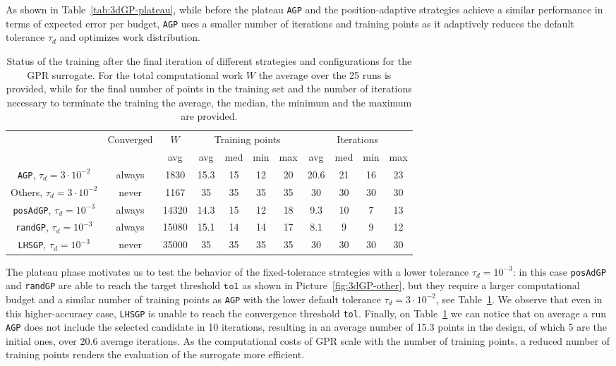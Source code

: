 As shown in Table~\ref{tab:3dGP-plateau}, while before the plateau \texttt{AGP} and the position-adaptive strategies achieve a similar performance in terms of expected error per budget, \texttt{AGP} uses a smaller number of iterations and training points as it adaptively reduces the default tolerance $\tau_d$ and optimizes work distribution.

\begin{table}[H]
    \centering
    \begin{tabular}{ccccccccccc}
    \toprule
        & Converged & $W$  & \multicolumn{4}{c}{Training points} & \multicolumn{4}{c}{Iterations} \\ 
        &   &  avg  & avg   & med   & min   & max   & avg   & med   & min   & max \\
        \midrule
        \texttt{AGP}, $\tau_d = 3 \cdot 10 ^{-2}$    
        &always & 1830 & 15.3  &  15   &  12   &  20   &  20.6 &  21   &   16  & 23   \\
        Others, $\tau_d = 3 \cdot 10 ^{-2}$    
        & never & 1167 &  35   &  35   &  35   &   35  &   30  &  30   &   30  & 30   \\
        \texttt{posAdGP}, $\tau_d = 10 ^{-3}$ 
        & always&14320 & 14.3  &  15   &  12   &   18  &  9.3  &  10   &   7   & 13   \\
        \texttt{randGP}, $\tau_d = 10 ^{-3}$ 
        & always&15080 & 15.1  &  14   &  14   &   17  &  8.1  &  9    &   9   & 12 \\
        \texttt{LHSGP}, $\tau_d = 10 ^{-3}$ 
        & never &35000 &  35   &  35   &  35   &   35  &   30  &   30  &   30  & 30   \\
    \bottomrule
    \end{tabular}
    \caption{Status of the training after the final iteration of different strategies and configurations for the GPR surrogate. For the total computational work $W$ the average over the 25 runs is provided, while for the final number of points in the training set and the number of iterations necessary to terminate the training the average, the median, the minimum and the maximum are provided.
    }
    \label{tab:3dGP-recap}
\end{table}

The plateau phase motivates us to test the behavior of the fixed-tolerance strategies with a lower tolerance $\tau_d = 10^{-3}$: in this case \texttt{posAdGP} and \texttt{randGP} are able to reach the target threshold $\texttt{tol}$ as shown in Picture~\ref{fig:3dGP-other}, but they require a larger computational budget and a similar number of training points as \texttt{AGP} with the lower default tolerance $\tau_d =  3\cdot 10^{-2}$, see Table~\ref{tab:3dGP-recap}.
We observe that even in this higher-accuracy case, \texttt{LHSGP} is unable to reach the convergence threshold \texttt{tol}.
Finally, on Table~\ref{tab:3dGP-recap} we can notice that on average a run \texttt{AGP} does not include the selected candidate in 10 iterations, resulting in an average number of 15.3 points in the design, of which 5 are the initial ones, over 20.6 average iterations.
As the computational costs of GPR scale with the number of training points, a reduced number of training points renders the evaluation of the surrogate more efficient.

